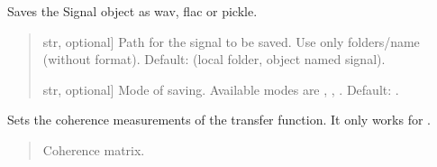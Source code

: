 \documentclass[letterpaper,10pt,english]{sphinxmanual}
\begin{document}
\begin{fulllineitems}
\begin{fulllineitems}
\label{\detokenize{classes:dsptools.classes.signal_class.Signal.save_signal}}
\pysigstartsignatures
{}
\pysigstopsignatures
\sphinxAtStartPar
Saves the Signal object as wav, flac or pickle.
\begin{quote}\begin{description}
\begin{description}
\sphinxlineitem{\sphinxstylestrong{path}}{[}str, optional{]}
\sphinxAtStartPar
Path for the signal to be saved. Use only folders/name
(without format). Default: 
(local folder, object named signal).

\sphinxlineitem{\sphinxstylestrong{mode}}{[}str, optional{]}
\sphinxAtStartPar
Mode of saving. Available modes are , , .
Default: .

\end{description}

\end{description}\end{quote}

\end{fulllineitems}


\begin{fulllineitems}
\label{\detokenize{classes:dsptools.classes.signal_class.Signal.set_coherence}}
\pysigstartsignatures
{}
\pysigstopsignatures
\sphinxAtStartPar
Sets the coherence measurements of the transfer function.
It only works for .
\begin{quote}\begin{description}
\begin{description}
\sphinxlineitem{\sphinxstylestrong{coherence}}{[}\sphinxtitleref{np.ndarray}{]}
\sphinxAtStartPar
Coherence matrix.


\end{description}
\end{description}
\end{quote}
\end{fulllineitems}
\end{fulllineitems}
\end{document}

